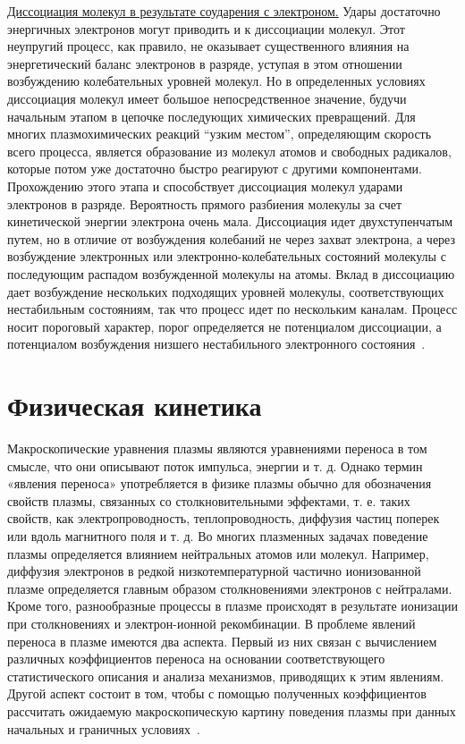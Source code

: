 \documentclass[10pt, a4paper]{article}
\let\stdsection\section
\renewcommand\section{\newpage\stdsection}
\begin{document}
\uline{Диссоциация молекул в результате соударения с электроном.} Удары достаточно энергичных электронов могут приводить и к диссоциации молекул. Этот неупругий процесс, как правило, не оказывает существенного влияния на энергетический баланс электронов в разряде, уступая в этом отношении возбуждению колебательных уровней молекул. Но в определенных условиях диссоциация молекул имеет большое непосредственное значение, будучи начальным этапом в цепочке последующих химических превращений. Для многих плазмохимических реакций ``узким местом'', определяющим скорость всего процесса, является образование из молекул атомов и свободных радикалов, которые потом уже достаточно быстро реагируют с другими компонентами. Прохождению этого этапа и способствует диссоциация молекул ударами электронов в разряде. Вероятность прямого разбиения молекулы за счет кинетической энергии электрона очень мала. Диссоциация идет двухступенчатым путем, но в отличие от возбуждения колебаний не через захват электрона, а через возбуждение электронных или электронно-колебательных состояний молекулы с последующим распадом возбужденной молекулы на атомы. Вклад в диссоциацию дает возбуждение нескольких подходящих уровней молекулы, соответствующих нестабильным состояниям, так что процесс идет по нескольким каналам. Процесс носит пороговый характер, порог определяется не потенциалом диссоциации, а потенциалом возбуждения низшего нестабильного электронного состояния~\cite{raizer}.

\section{Физическая кинетика}

Макроскопические уравнения плазмы являются уравнениями переноса в том смысле, что они описывают поток импульса, энергии и т. д. Однако термин «явления переноса» употребляется в физике плазмы обычно для обозначения свойств плазмы, связанных со столкновительными эффектами, т. е. таких свойств, как электропроводность, теплопроводность, диффузия частиц поперек или вдоль магнитного поля и т. д. Во многих плазменных задачах поведение плазмы определяется влиянием нейтральных атомов или молекул. Например, диффузия электронов в редкой низкотемпературной частично ионизованной плазме определяется главным образом столкновениями электронов с нейтралами. Кроме того, разнообразные процессы в плазме происходят в результате ионизации при столкновениях и электрон-ионной рекомбинации. В проблеме явлений переноса в плазме имеются два аспекта. Первый из них связан с вычислением различных коэффициентов переноса на основании соответствующего статистического описания и анализа механизмов, приводящих к этим явлениям. Другой аспект состоит в том, чтобы с помощью полученных коэффициентов рассчитать ожидаемую макроскопическую картину поведения плазмы при данных начальных и граничных условиях~\cite{kroll}.
\end{document}
